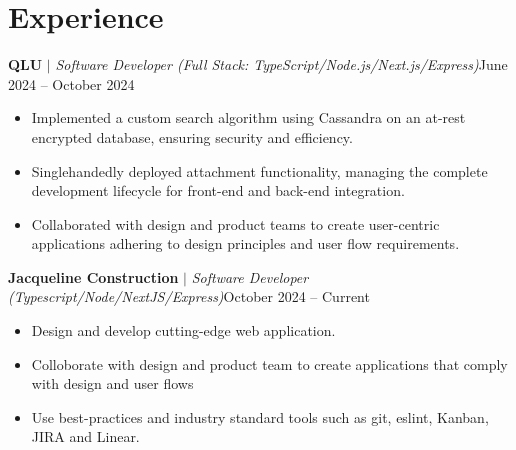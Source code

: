 
\section{Experience}
  \resumeSubHeadingListStart

          
          \resumeProjectHeading
          {\textbf{QLU}\vspace{8pt} $|$ \footnotesize\emph{Software Developer (Full Stack: TypeScript/Node.js/Next.js/Express)}}{June 2024 -- October 2024}
          \begin{itemize}
            \item Implemented a custom search algorithm using Cassandra on an at-rest encrypted database, ensuring security and efficiency.
            \item Singlehandedly deployed attachment functionality, managing the complete development lifecycle for front-end and back-end integration.
            \item Collaborated with design and product teams to create user-centric applications adhering to design principles and user flow requirements.
          \end{itemize}
          
          \resumeProjectHeading
          {\textbf{Jacqueline Construction}\vspace{8pt} $|$ \footnotesize\emph{Software Developer (Typescript/Node/NextJS/Express)}}{October 2024 -- Current}
            \begin{itemize}
              \item 
              Design and develop cutting-edge web application. 
              \item 
              Colloborate with design and product team to create applications that comply with design and user flows
              \item 
              Use best-practices and industry standard tools such as git, eslint, Kanban, JIRA and Linear. 
          \end{itemize}

